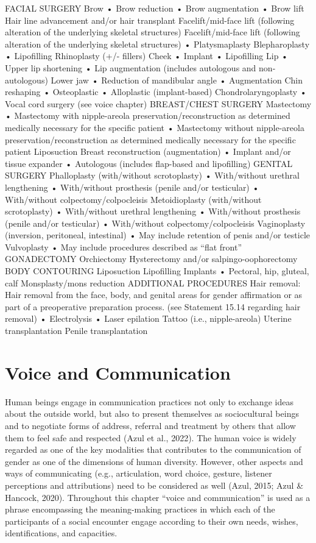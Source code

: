 \documentclass[
]{book}
\begin{document}
FACIAL SURGERY
Brow • Brow reduction
• Brow augmentation
• Brow lift
Hair line advancement and/or hair transplant
Facelift/mid-face lift (following alteration of the underlying skeletal
structures)
Facelift/mid-face lift (following alteration of the underlying skeletal
structures)
• Platysmaplasty
Blepharoplasty • Lipofilling
Rhinoplasty (+/- fillers)
Cheek • Implant
• Lipofilling
Lip • Upper lip shortening
• Lip augmentation (includes autologous and non-autologous)
Lower jaw • Reduction of mandibular angle
• Augmentation
Chin reshaping • Osteoplastic
• Alloplastic (implant-based)
Chondrolaryngoplasty • Vocal cord surgery (see voice chapter)
BREAST/CHEST SURGERY
Mastectomy • Mastectomy with nipple-areola preservation/reconstruction as determined
medically necessary for the specific patient
• Mastectomy without nipple-areola preservation/reconstruction as
determined medically necessary for the specific patient
Liposuction
Breast reconstruction (augmentation) • Implant and/or tissue expander
• Autologous (includes flap-based and lipofilling)
GENITAL SURGERY
Phalloplasty (with/without scrotoplasty) • With/without urethral lengthening
• With/without prosthesis (penile and/or testicular)
• With/without colpectomy/colpocleisis
Metoidioplasty (with/without scrotoplasty) • With/without urethral lengthening
• With/without prosthesis (penile and/or testicular)
• With/without colpectomy/colpocleisis
Vaginoplasty (inversion, peritoneal, intestinal) • May include retention of penis and/or testicle
Vulvoplasty • May include procedures described as ``flat front''
GONADECTOMY
Orchiectomy
Hysterectomy and/or salpingo-oophorectomy
BODY CONTOURING
Liposuction
Lipofilling
Implants • Pectoral, hip, gluteal, calf
Monsplasty/mons reduction
ADDITIONAL PROCEDURES
Hair removal: Hair removal from the face, body, and genital areas
for gender affirmation or as part of a preoperative preparation
process. (see Statement 15.14 regarding hair removal)
• Electrolysis
• Laser epilation
Tattoo (i.e., nipple-areola)
Uterine transplantation
Penile transplantation

\hypertarget{voice-and-communication}{%
\chapter{Voice and Communication}\label{voice-and-communication}}

Human beings engage in communication practices not only to exchange ideas about the outside
world, but also to present themselves as sociocultural beings and to negotiate forms of address,
referral and treatment by others that allow them
to feel safe and respected (Azul et al., 2022). The
human voice is widely regarded as one of the
key modalities that contributes to the communication of gender as one of the dimensions of
human diversity. However, other aspects and ways
of communicating (e.g., articulation, word choice,
gesture, listener perceptions and attributions)
need to be considered as well (Azul, 2015; Azul
\& Hancock, 2020). Throughout this chapter
``voice and communication'' is used as a phrase
encompassing the meaning-making practices in
which each of the participants of a social encounter engage according to their own needs, wishes,
identifications, and capacities.
\end{document}
